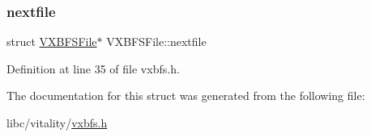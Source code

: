 \subsubsection{\texorpdfstring{nextfile}{nextfile}}
{\footnotesize\ttfamily struct \hyperlink{a00336}{V\+X\+B\+F\+S\+File}$\ast$ V\+X\+B\+F\+S\+File\+::nextfile}



Definition at line 35 of file vxbfs.\+h.



The documentation for this struct was generated from the following file\+:\begin{DoxyCompactItemize}
\item 
libc/vitality/\hyperlink{a00206}{vxbfs.\+h}\end{DoxyCompactItemize}
